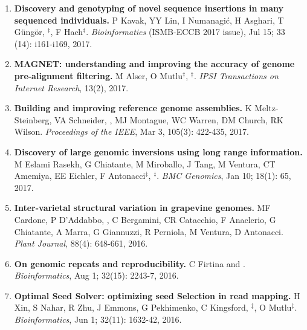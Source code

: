 \begin{enumerate}
  \item
                                     

         {\bf Discovery and genotyping of novel sequence insertions in many sequenced individuals.}
         P Kavak, YY Lin, I Numanagić, H Asghari, T Güngör, \calkan{}$^\ddag$, F Hach$^\ddag$.
         {\em Bioinformatics} (ISMB-ECCB 2017 issue), Jul 15;  33 (14): i161-i169, 2017.\\
         
  \item
                                       
         {\bf MAGNET: understanding and improving the accuracy of genome pre-alignment filtering.}
         M Alser, O Mutlu$^\ddag$, \calkan{}$^\ddag$. 
         {\em IPSI Transactions on Internet Research}, 13(2), 2017.



         
  \item        
         {\bf Building and improving reference genome assemblies.} K Meltz-Steinberg, VA Schneider, \calkan{}, MJ Montague, WC Warren, DM Church, RK Wilson.
         {\em Proceedings of the IEEE}, Mar 3, 105(3): 422-435, 2017.


  \item        
         {\bf Discovery of large genomic inversions using long
range information.} M Eslami Rasekh, G Chiatante, M Miroballo, J Tang, M Ventura, CT Amemiya, EE Eichler, F Antonacci$^\ddag$, \calkan{}$^\ddag$.
         {\em BMC Genomics}, Jan 10;  18(1): 65, 2017.

  \item        
  {\bf Inter-varietal structural variation in grapevine genomes.}
 MF Cardone, P D'Addabbo, \calkan{}, C Bergamini, CR Catacchio, F Anaclerio, G Chiatante, A Marra, G Giannuzzi, R Perniola, M Ventura, D Antonacci.
 {\em Plant Journal}, 88(4): 648-661, 2016.

  \item        
  {\bf On genomic repeats and reproducibility.}
  C Firtina and \calkan{}.
 {\em Bioinformatics}, Aug 1;   32(15): 2243-7, 2016.

  \item        
  {\bf Optimal Seed Solver: optimizing seed Selection in read mapping.}
  H Xin, S Nahar, R Zhu, J Emmons, G Pekhimenko, C Kingsford, \calkan{}$^\ddag$, O Mutlu$^\ddag$.
 {\em Bioinformatics}, Jun 1;  32(11): 1632-42, 2016.


\end{enumerate}
